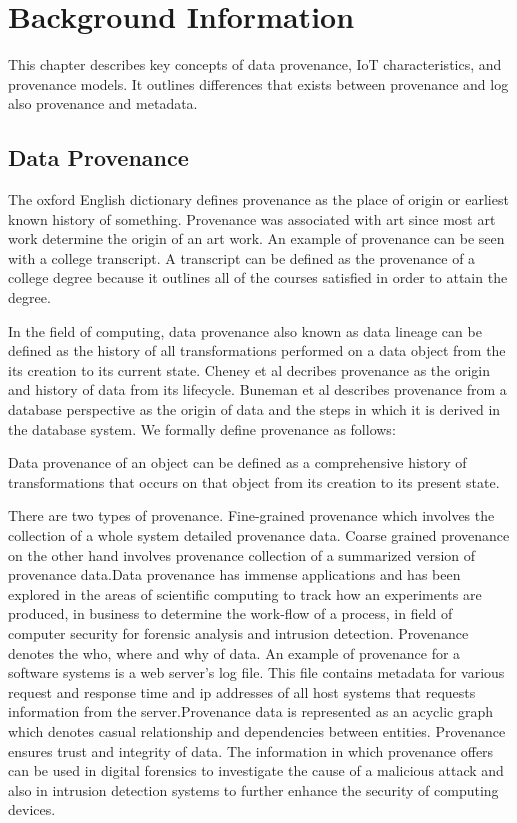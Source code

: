 \chapter{Background Information}

This chapter describes key concepts of data provenance, IoT characteristics, and provenance models. It outlines differences that exists between provenance and log also provenance and metadata. 

\section{Data Provenance}
The oxford English dictionary defines provenance as the place of origin or earliest known history of something. Provenance was associated with art since most art work determine the origin of an art work. An example of provenance can be seen with a college transcript. A transcript can be defined as the provenance of a college degree because it outlines all of the courses satisfied in order to attain the degree.
\par In the field of computing, data provenance also known as  data lineage can be defined as the history of all transformations performed on a data object from the its creation to its current state. Cheney et al decribes provenance as the origin and history of data from its lifecycle. Buneman et al describes provenance from a database perspective as the origin of data and the steps in which it is derived in the database system.  We formally define provenance as follows:


\begin{definition}

Data provenance of an object can be defined as a comprehensive history of transformations that occurs on that object from its creation to its present state.

\end{definition}
There are two types of provenance. Fine-grained provenance which involves the collection of a whole system detailed provenance data. Coarse grained provenance on the other hand involves provenance collection of a summarized version of provenance data.Data provenance has immense applications and has been explored in the areas of scientific computing to track how an experiments are produced, in business to determine the work-flow of  a process, in field of computer security for forensic analysis and intrusion detection. Provenance denotes the who, where and why of data. An example of provenance for a software systems is a web server's log file. This file contains metadata for various request and response time and ip addresses of all host systems that requests information from the server.Provenance data is represented as an acyclic graph which denotes casual relationship and dependencies between entities. Provenance ensures trust and integrity of data. The information in which provenance offers can be used in digital forensics to investigate the cause of a malicious attack and also in intrusion detection systems to further enhance the security of computing devices. 


